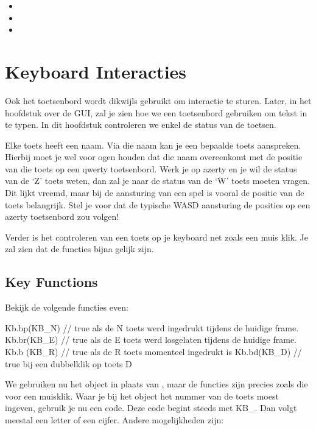 \begin{itemize}
	\item {}
	\item {}
	\item {}
\end{itemize}

\section{Keyboard Interacties}
Ook het toetsenbord wordt dikwijls gebruikt om interactie te sturen. Later, in het hoofdstuk over de GUI, zal je zien hoe we een toetsenbord gebruiken om tekst in te typen. In dit hoofdstuk controleren we enkel de status van de toetsen.

Elke toets heeft een naam. Via die naam kan je een bepaalde toets aanspreken. Hierbij moet je wel voor ogen houden dat die naam overeenkomt met de positie van die toets op een qwerty toetsenbord. Werk je op azerty en je wil de status van de `Z' toets weten, dan zal je naar de status van de `W' toets moeten vragen. Dit lijkt vreemd, maar bij de aansturing van een spel is vooral de positie van de toets belangrijk. Stel je voor dat de typische WASD aansturing de posities op een azerty toetsenbord zou volgen!

Verder is het controleren van een toets op je keyboard net zoals een muis klik. Je zal zien dat de functies bijna gelijk zijn.

\subsection{Key Functions}

Bekijk de volgende functies even:

\begin{code}
Kb.bp(KB_N) // true als de N toets werd ingedrukt tijdens de huidige frame.
Kb.br(KB_E) // true als de E toets werd losgelaten tijdens de huidige frame.
Kb.b (KB_R) // true als de R toets momenteel ingedrukt is
Kb.bd(KB_D) // true bij een dubbelklik op toets D
\end{code}

We gebruiken nu het object  in plaats van , maar de functies zijn precies zoals die voor een muisklik. Waar je bij het  object het nummer van de toets moest ingeven, gebruik je nu een code. Deze code begint steeds met KB\_. Dan volgt meestal een letter of een cijfer. Andere mogelijkheden zijn:

